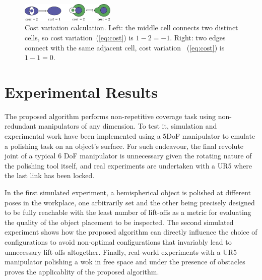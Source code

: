 \documentclass[journal]{IEEEtran}
\begin{document}
\begin{figure}[t]
\centering
\includegraphics[width = 0.4\textwidth]{proof/costcal}
\caption{Cost variation calculation. Left: the middle cell connects two distinct cells, so cost variation~(\ref{eq:cost}) is $1-2 = -1$. 
Right: two edges connect with the same adjacent cell, cost variation ~(\ref{eq:cost}) is $1-1 = 0$.} %
\label{figcost}
\end{figure}

\section{Experimental Results}
\label{sectionexperiment}
The proposed algorithm performs non-repetitive coverage task using non-redundant manipulators of any dimension. 
To test it, simulation and experimental work have been implemented using a 5DoF manipulator to emulate a polishing 
task on an object's surface. For such endeavour, the final revolute joint of a typical 6 DoF manipulator is 
unnecessary given the rotating nature of the polishing tool itself, and real experiments are undertaken with a 
UR5 where the last link has been locked.

In the first simulated experiment, a hemispherical object is polished at different poses in the workplace, one arbitrarily set and the other being precisely designed to be fully reachable with the least number of lift-offs as a metric for evaluating the quality of the object placement to be inspected. 
The second simulated experiment shows how the proposed algorithm can directly influence the choice of configurations 
to avoid non-optimal configurations that invariably lead to unnecessary lift-offs altogether.
Finally, real-world experiments with a UR5 manipulator polishing a wok 
in free space and under the presence of obstacles proves the applicablity of the proposed algorithm. 
\end{document}
